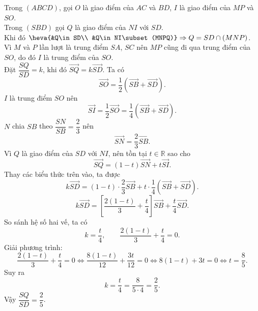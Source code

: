 \begin{ex}
{\begin{center}
		\end{center}
		Trong $(ABCD)$, gọi $O$ là giao điểm của $AC$ và $BD$, $I$ là giao điểm của $MP$ và $SO$.\\ 
		Trong $(SBD)$ gọi $Q$ là giao điểm của $NI$ với $SD$.\\  Khi đó $\heva{&Q\in SD\\
		&Q\in NI\subset (MNPQ)} \Rightarrow  Q=SD\cap (MNP)$.\\
		 Vì $M$ và $P$ lần lượt là trung điểm $SA$, $SC$ nên $MP$ cũng đi qua trung điểm của $SO$, do đó $I$ là trung điểm của $SO$.\\
		Đặt $\dfrac{SQ}{SD}=k$, khi đó $\overrightarrow{SQ}=k \overrightarrow{SD}$. Ta có 
		 \[\overrightarrow{SO}=\dfrac{1}{2}\left(\overrightarrow{SB}+\overrightarrow{SD}\right).\]
		$I$ là trung điểm $SO$  nên
		\[\overrightarrow{SI}=\dfrac{1}{2}\overrightarrow{SO}=\dfrac{1}{4}\left(\overrightarrow{SB}+\overrightarrow{SD}\right).\] 
		$N$ chia $SB$ theo $\dfrac{SN}{SB}=\dfrac{2}{3}$ nên 
		 \[\overrightarrow{SN}=\dfrac{2}{3}\overrightarrow{SB}.\]
		Vì $Q$ là giao điểm của $SD$ với  $NI$, nên tồn tại $t\in\mathbb{R}$ sao cho
		 \[\overrightarrow{SQ}=(1-t)\overrightarrow{SN}+t\overrightarrow{SI}.\]
		Thay các biểu thức trên  vào, ta được
		 \[k\overrightarrow{SD}=(1-t)\cdot\dfrac{2}{3}\overrightarrow{SB}+t\cdot\dfrac{1}{4}\left(\overrightarrow{SB}+\overrightarrow{SD}\right).\]
		\[k\overrightarrow{SD}=\left[\dfrac{2(1-t)}{3}+\dfrac{t}{4}\right]\overrightarrow{SB}+\dfrac{t}{4}\overrightarrow{SD}.\] 
		 So sánh hệ số hai vế, ta có
		\[k=\dfrac{t}{4},  \qquad \dfrac{2(1-t)}{3}+\dfrac{t}{4}=0.\]
		 Giải phương trình:
		 \[\dfrac{2(1-t)}{3}+\frac{t}{4}=0
		 \Leftrightarrow \dfrac{8(1-t)}{12}+\frac{3t}{12}=0
		\Leftrightarrow  8(1-t)+3t=0
		 \Leftrightarrow t=\dfrac{8}{5}.\]
		 Suy ra
		\[k=\frac{t}{4}=\dfrac{8}{5  \cdot 4}=\dfrac{2}{5}.\]
		Vậy  $\dfrac{SQ}{SD}=\dfrac{2}{5}$.
	} 
\end{ex}

